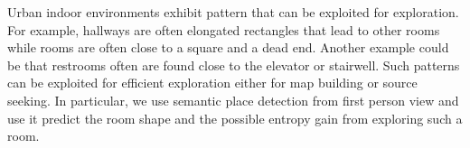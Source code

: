 Urban indoor environments exhibit pattern that can be exploited for exploration.
For example, hallways are often elongated rectangles that lead to other rooms
while rooms are often close to a square and a dead end.
Another example could be that restrooms often are found close to the elevator or stairwell.
Such patterns can be exploited for efficient exploration either for map building
or source seeking.
In particular, we use semantic place detection from first person view and use it
predict the room shape and the possible entropy gain from exploring such a room.
